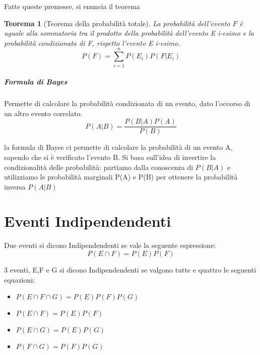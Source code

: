 \documentclass[12pt]{article}
\newtheorem{theorem}{Teorema}[section]
\begin{document}
Fatte queste premesse, si enuncia il teorema
\begin{theorem}[Teorema della probabilità totale]
    La probabilità dell'evento \(F\) è uguale alla sommatoria tra il prodotto
    della probabilità dell'evento E i-esimo e la probabilità condizionata di F, rispetto l'evento
    E i-esimo. 
    \[
    P(F) = \sum_{i=1}^{n} P(E_i)P(F|E_i)   
    \]
\end{theorem}


\subparagraph*{Formula di Bayes} 
Permette di calcolare la probabilità condizionata di un evento, dato l'occorso
di un altro evento correlato. 
\[
    P(A|B) = \frac{P(B|A) P(A)}{P(B)}     
\]

la formula di Bayes ci permette di calcolare la probabilità di un evento A, 
sapendo che si è verificato l'evento B. Si basa sull'idea di invertire la condizionalità delle probabilità: partiamo dalla conoscenza di \(P(B|A)\) e utilizziamo le probabilità marginali P(A) e P(B) per ottenere la probabilità inversa \(P(A|B)\)


\newpage
\section{Eventi Indipendendenti}
Due eventi si dicono Indipendendenti se vale la seguente espressione: 
\[
P(E \cap F) = P(E)P(F)    
\]

3 eventi, E,F e G si dicono Indipendendenti se valgono tutte e quattro le seguenti
equazioni: 
\begin{itemize}
    \item \(P(E \cap F \cap G) = P(E)P(F)P(G)\)
    \item \(P(E \cap F) = P(E)P(F)\)
    \item \(P(E \cap G) = P(E)P(G)\)
    \item \(P(F \cap G) = P(F)P(G)\)
\end{itemize}
\end{document}
